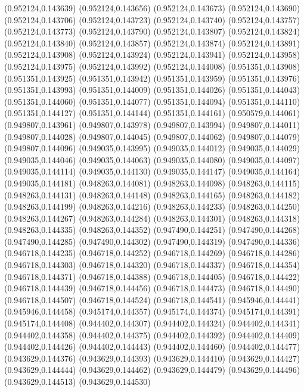 (0.952124,0.143639)
(0.952124,0.143656)
(0.952124,0.143673)
(0.952124,0.143690)
(0.952124,0.143706)
(0.952124,0.143723)
(0.952124,0.143740)
(0.952124,0.143757)
(0.952124,0.143773)
(0.952124,0.143790)
(0.952124,0.143807)
(0.952124,0.143824)
(0.952124,0.143840)
(0.952124,0.143857)
(0.952124,0.143874)
(0.952124,0.143891)
(0.952124,0.143908)
(0.952124,0.143924)
(0.952124,0.143941)
(0.952124,0.143958)
(0.952124,0.143975)
(0.952124,0.143992)
(0.952124,0.144008)
(0.951351,0.143908)
(0.951351,0.143925)
(0.951351,0.143942)
(0.951351,0.143959)
(0.951351,0.143976)
(0.951351,0.143993)
(0.951351,0.144009)
(0.951351,0.144026)
(0.951351,0.144043)
(0.951351,0.144060)
(0.951351,0.144077)
(0.951351,0.144094)
(0.951351,0.144110)
(0.951351,0.144127)
(0.951351,0.144144)
(0.951351,0.144161)
(0.950579,0.144061)
(0.949807,0.143961)
(0.949807,0.143978)
(0.949807,0.143994)
(0.949807,0.144011)
(0.949807,0.144028)
(0.949807,0.144045)
(0.949807,0.144062)
(0.949807,0.144079)
(0.949807,0.144096)
(0.949035,0.143995)
(0.949035,0.144012)
(0.949035,0.144029)
(0.949035,0.144046)
(0.949035,0.144063)
(0.949035,0.144080)
(0.949035,0.144097)
(0.949035,0.144114)
(0.949035,0.144130)
(0.949035,0.144147)
(0.949035,0.144164)
(0.949035,0.144181)
(0.948263,0.144081)
(0.948263,0.144098)
(0.948263,0.144115)
(0.948263,0.144131)
(0.948263,0.144148)
(0.948263,0.144165)
(0.948263,0.144182)
(0.948263,0.144199)
(0.948263,0.144216)
(0.948263,0.144233)
(0.948263,0.144250)
(0.948263,0.144267)
(0.948263,0.144284)
(0.948263,0.144301)
(0.948263,0.144318)
(0.948263,0.144335)
(0.948263,0.144352)
(0.947490,0.144251)
(0.947490,0.144268)
(0.947490,0.144285)
(0.947490,0.144302)
(0.947490,0.144319)
(0.947490,0.144336)
(0.946718,0.144235)
(0.946718,0.144252)
(0.946718,0.144269)
(0.946718,0.144286)
(0.946718,0.144303)
(0.946718,0.144320)
(0.946718,0.144337)
(0.946718,0.144354)
(0.946718,0.144371)
(0.946718,0.144388)
(0.946718,0.144405)
(0.946718,0.144422)
(0.946718,0.144439)
(0.946718,0.144456)
(0.946718,0.144473)
(0.946718,0.144490)
(0.946718,0.144507)
(0.946718,0.144524)
(0.946718,0.144541)
(0.945946,0.144441)
(0.945946,0.144458)
(0.945174,0.144357)
(0.945174,0.144374)
(0.945174,0.144391)
(0.945174,0.144408)
(0.944402,0.144307)
(0.944402,0.144324)
(0.944402,0.144341)
(0.944402,0.144358)
(0.944402,0.144375)
(0.944402,0.144392)
(0.944402,0.144409)
(0.944402,0.144426)
(0.944402,0.144443)
(0.944402,0.144460)
(0.944402,0.144477)
(0.943629,0.144376)
(0.943629,0.144393)
(0.943629,0.144410)
(0.943629,0.144427)
(0.943629,0.144444)
(0.943629,0.144462)
(0.943629,0.144479)
(0.943629,0.144496)
(0.943629,0.144513)
(0.943629,0.144530)
